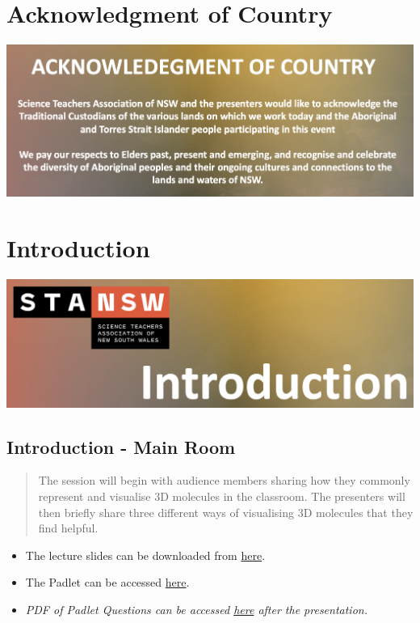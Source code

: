 \documentclass[
]{book}
\providecommand{\tightlist}{%
  \setlength{\itemsep}{0pt}\setlength{\parskip}{0pt}}
\begin{document}
\hypertarget{acknowledgment-of-country}{%
\chapter{Acknowledgment of Country}\label{acknowledgment-of-country}}

\includegraphics[width=23.36in]{images/Acknowledgment_of_Country}

\hypertarget{introduction}{%
\chapter{Introduction}\label{introduction}}

\includegraphics[width=25.22in]{images/Introduction}

\hypertarget{introduction---main-room}{%
\section*{Introduction - Main Room}\label{introduction---main-room}}

\begin{quote}
The session will begin with audience members sharing how they commonly represent and visualise 3D molecules in the classroom. The presenters will then briefly share three different ways of visualising 3D molecules that they find helpful.
\end{quote}

\begin{itemize}
\tightlist
\item
  The lecture slides can be downloaded from \href{}{here}.
\item
  The Padlet can be accessed \href{}{here}.
\item
  \emph{PDF of Padlet Questions can be accessed \href{}{here} after the presentation.}
\end{itemize}
\end{document}
